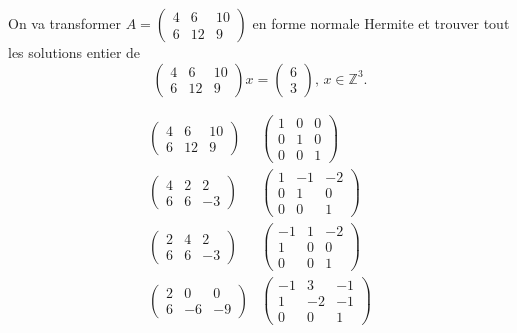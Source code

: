  \begin{example}
    \label{exe:29}
    On va transformer $A = \left(\begin{matrix}4 & 6 & 10\\6 & 12 & 9\end{matrix}\right)$ en forme normale Hermite et trouver tout les solutions entier de
    \begin{equation}
      \label{eq:46}
      \left(\begin{matrix}4 & 6 & 10\\6 & 12 & 9\end{matrix}\right) x =
      \begin{pmatrix}
        6 \\ 3
      \end{pmatrix}, \, x ∈ ℤ^3. 
    \end{equation}
    
    \begin{equation}
      \label{eq:45}
      \begin{array}{cc}
      \left(\begin{matrix}4 & 6 & 10\\6 & 12 & 9\end{matrix}\right) &  
\left(\begin{matrix}1 & 0 & 0\\0 & 1 & 0\\0 & 0 & 1\end{matrix}\right) \\

\left(\begin{matrix}4 & 2 & 2\\6 & 6 & -3\end{matrix}\right) &  
\left(\begin{matrix}1 & -1 & -2\\0 & 1 & 0\\0 & 0 & 1\end{matrix}\right) \\

\left(\begin{matrix}2 & 4 & 2\\6 & 6 & -3\end{matrix}\right) &
\left(\begin{matrix}-1 & 1 & -2\\1 & 0 & 0\\0 & 0 & 1\end{matrix}\right)\\

\left(\begin{matrix}2 & 0 & 0\\6 & -6 & -9\end{matrix}\right)&
\left(\begin{matrix}-1 & 3 & -1\\1 & -2 & -1\\0 & 0 & 1\end{matrix}\right)\\


\end{array}
\end{equation}
\end{example}
